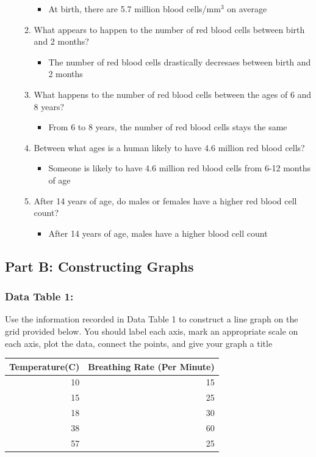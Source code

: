 \documentclass{scrartcl}
\begin{document}
\begin{enumerate}
\begin{enumerate}
\begin{itemize}
\item At birth, there are 5.7 million blood cells/mm\(^{3}\) on average
\end{itemize}
\item What appears to happen to the number of red blood cells between birth and 2 months?
\begin{itemize}
\item The number of red blood cells drastically decresaes between birth and 2 months
\end{itemize}
\item What happens to the number of red blood cells between the ages of 6 and 8 years?
\begin{itemize}
\item From 6 to 8 years, the number of red blood cells stays the same
\end{itemize}
\item Between what ages is a human likely to have 4.6 million red blood cells?
\begin{itemize}
\item Someone is likely to have 4.6 million red blood cells from 6-12 months of age
\end{itemize}
\item After 14 years of age, do males or females have a higher red blood cell count?
\begin{itemize}
\item After 14 years of age, males have a higher blood cell count
\end{itemize}
\end{enumerate}
\end{enumerate}

\subsection{Part B: Constructing Graphs}
\label{sec:orgee9a868}
\subsubsection{Data Table 1:}
\label{sec:orged790f0}
Use the information recorded in Data Table 1 to construct a line
graph on the grid provided below. You should label each axis, mark an appropriate scale on each axis, plot the data, connect the points,
and give your graph a title

\begin{center}
\begin{tabular}{rr}
\toprule
Temperature(C) & Breathing Rate (Per Minute)\\
\midrule
10 & 15\\
\midrule
15 & 25\\
\midrule
18 & 30\\
\midrule
38 & 60\\
\midrule
57 & 25\\
\bottomrule
\end{tabular}
\end{center}
\end{document}

